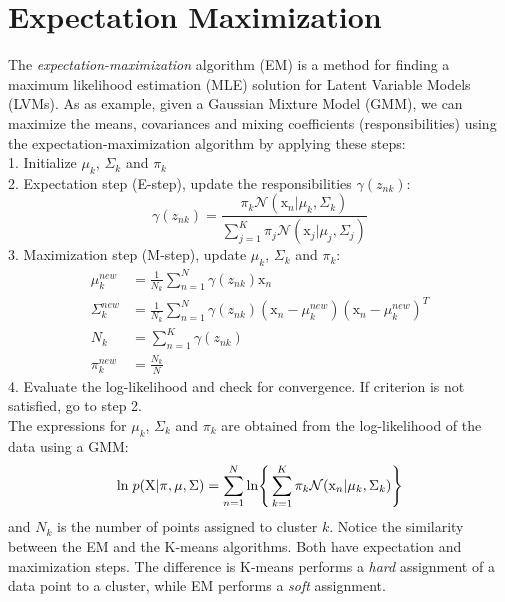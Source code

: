 \section{Expectation Maximization}
The \textit{expectation-maximization} algorithm (EM) is a method for finding a maximum likelihood estimation (MLE) solution for Latent Variable Models (LVMs). As as example, given a Gaussian Mixture Model (GMM), we can maximize the means, covariances and mixing coefficients (responsibilities) using the expectation-maximization algorithm by applying these steps: \\
1. Initialize $\mu_k$, $\Sigma_k$ and $\pi_k$ \\
2. Expectation step (E-step), update the responsibilities $\gamma(z_{nk})$: \\
$$
\gamma(z_{nk}) = \frac{\pi_k\mathcal{N}(\mathrm{x}_n|\mu_k,\Sigma_k)}{\sum\limits_{j=1}^{K} \pi_j \mathcal{N} (\mathrm{x}_j|\mu_j,\Sigma_j)}
$$
3. Maximization step (M-step), update $\mu_k$, $\Sigma_k$ and $\pi_k$:
\begin{align*}
    \mu_k^{new} & = \frac{1}{N_k}\sum_{n=1}^N  \gamma(z_{nk})\mathrm{x}_n \\
    \Sigma_k^{new} & = \frac{1}{N_k}\sum_{n=1}^N  \gamma(z_{nk})(\mathrm{x}_n - \mu_k^{new})(\mathrm{x}_n - \mu_k^{new})^T \\
    N_k & = \sum_{n=1}^K \gamma(z_{nk}) \\
    \pi_k^{new} & = \frac{N_k}{N}
\end{align*}
4. Evaluate the log-likelihood and check for convergence. If criterion is not satisfied, go to step 2.\\
    The expressions for $\mu_k$, $\Sigma_k$ and $\pi_k$ are obtained from the log-likelihood of the data using a GMM:
\begin{equation}
    \mathrm{ln}\hspace{1mm}p(\mathrm{X}|\pi, \mu, \Sigma) = \sum_{n=1}^N\mathrm{ln}\Bigg\{ \sum_{k=1}^K \pi_k\mathcal{N}(\mathrm{x}_n|\mu_k, \Sigma_k) \Bigg\}
\end{equation}
and $N_k$ is the number of points assigned to cluster $k$. Notice the similarity between the EM and the K-means algorithms. Both have expectation and maximization steps. The difference is K-means performs a \textit{hard} assignment of a data point to a cluster, while EM performs a \textit{soft} assignment.
 
